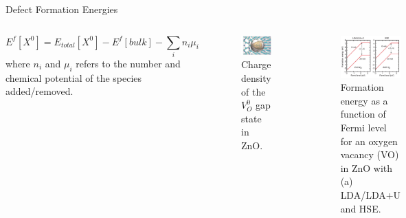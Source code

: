 \documentclass[aspectratio=169]{beamer}
\begin{document}
\begin{frame}{Defect Formation Energies}

\begin{columns}
\begin{equation*}
E^f[X^0] = E_{total}[X^0] - E^f[bulk] - \sum_i n_i \mu_i
\end{equation*} 
where $n_i$ and $\mu_i$ refers to the number and chemical potential of the species added/removed.

\begin{figure}
    \centering
    \includegraphics[width=0.5\linewidth]{lectures/figures/8_Defect_Charge_Density.png}
    \caption{Charge density of the $V_O^0$ gap state in ZnO. \cite{vandewalleAdvancesElectronicStructure2011}}
\end{figure} 

\begin{figure}
    \centering
    \includegraphics[width=0.85\linewidth]{lectures/figures/8_Defect_Diagram.png}
    \caption{Formation energy as a function of Fermi level for an oxygen vacancy (VO) in ZnO with (a) LDA/LDA+U and HSE.\cite{vandewalleAdvancesElectronicStructure2011}}
\end{figure} 

\end{columns}

\end{frame} 
\end{document}

